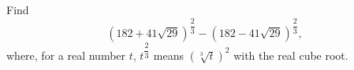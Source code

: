 Find
\[
\left(182+41\sqrt{29}\right)^{\dfrac{2}{3}}-\left(182-41\sqrt{29}\right)^{\dfrac{2}{3}},
\]
where, for a real number $t$, $t^{\dfrac{2}{3}}$ means $\left(\sqrt[3]{t}\right)^2$ with the real cube root.
